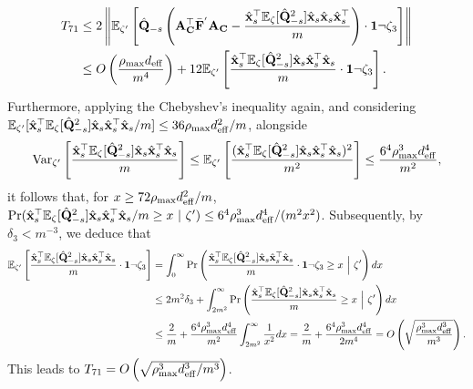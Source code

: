 \documentclass[11pt,a4paper]{article}
\begin{document}
\begin{align}
    T_{71}&\leq 2\left\|{\mathbb{E}}_{\zeta'}\left[\hat{\mathbf{Q}}_{-s}\left(\mathbf{A}_{\mathbf{C}}^\top\bar{\mathbf{F}}^{'}\mathbf{A}_{\mathbf{C}}-\frac{\hat{\mathbf{x}}_s^\top{\mathbb{E}}_{\zeta}[\hat{\mathbf{Q}}^2_{-s}]\hat{\mathbf{x}}_s\hat{\mathbf{x}}_s\hat{\mathbf{x}}_s^\top}{m}\right) \cdot \mathbf{1}\neg\zeta_3\right]\right\|\nonumber\\
    &\leq O\left(\frac{\rho_{\max}  d_{\mathrm{eff}}}{m^4}\right)+12 {\mathbb{E}}_{\zeta'}\left[\frac{\hat{\mathbf{x}}_s^\top{\mathbb{E}}_{\zeta}[\hat{\mathbf{Q}}^2_{-s}]\hat{\mathbf{x}}_s\hat{\mathbf{x}}_s^\top\hat{\mathbf{x}}_s}{m} \cdot \mathbf{1}\neg\zeta_3\right]. \nonumber
\end{align}
Furthermore, applying the Chebyshev's inequality again, and considering  ${\mathbb{E}}_{\zeta'}[\hat{\mathbf{x}}_s^\top{\mathbb{E}}_{\zeta}[\hat{\mathbf{Q}}^2_{-s}]\hat{\mathbf{x}}_s\hat{\mathbf{x}}_s^\top\hat{\mathbf{x}}_s/m]\leq 36\rho_{\max} d^2_{\mathrm{eff}}/m$, alongside 
\begin{align}
    \operatorname{Var}_{\zeta'}\left[\frac{\hat{\mathbf{x}}_s^\top{\mathbb{E}}_{\zeta}[\hat{\mathbf{Q}}^2_{-s}]\hat{\mathbf{x}}_s\hat{\mathbf{x}}_s^\top\hat{\mathbf{x}}_s}{m}
    \right]\leq {\mathbb{E}}_{\zeta'}\left[\frac{(\hat{\mathbf{x}}_s^\top{\mathbb{E}}_{\zeta}[\hat{\mathbf{Q}}^2_{-s}]\hat{\mathbf{x}}_s\hat{\mathbf{x}}_s^\top\hat{\mathbf{x}}_s)^2}{m^2}\right]\leq \frac{6^4\rho_{\max}^3d^4_{\mathrm{eff}}}{m^2},\nonumber
\end{align}
 it follows that, for  $x\geq 72\rho_{\max} d^2_{\mathrm{eff}}/m$, $ \Pr(\hat{\mathbf{x}}_s^\top {\mathbb{E}}_{\zeta}[\hat{\mathbf{Q}}^2_{-s}]\hat{\mathbf{x}}_s\hat{\mathbf{x}}_s^\top\hat{\mathbf{x}}_s/m\geq x~|~\zeta')\leq 
 6^4\rho_{\max}^3 d^4_{\mathrm{eff}}/(m^2x^2)$.
Subsequently, by $\delta_3<m^{-3}$,  we deduce that
 \begin{align}
    {\mathbb{E}}_{\zeta'}\left[\frac{\hat{\mathbf{x}}_s^\top{\mathbb{E}}_{\zeta}[\hat{\mathbf{Q}}^2_{-s}]\hat{\mathbf{x}}_s\hat{\mathbf{x}}_s^\top\hat{\mathbf{x}}_s}{m} \cdot \mathbf{1}\neg\zeta_3\right]&=\int^\infty_0 \Pr\left(\frac{\hat{\mathbf{x}}_s^\top {\mathbb{E}}_{\zeta}[\hat{\mathbf{Q}}^2_{-s}]\hat{\mathbf{x}}_s\hat{\mathbf{x}}_s^\top\hat{\mathbf{x}}_s}{m} \cdot \mathbf{1}\neg\zeta_3\geq x  ~\Big|~\zeta'\right)dx \nonumber\\
    &\leq 2m^{2}\delta_3+\int^\infty_{2m^{2}}\Pr\left(\frac{\hat{\mathbf{x}}_s^\top {\mathbb{E}}_{\zeta}[\hat{\mathbf{Q}}^2_{-s}]\hat{\mathbf{x}}_s\hat{\mathbf{x}}_s^\top\hat{\mathbf{x}}_s}{m}\geq x~\Big|~\zeta'\right)dx\nonumber\\
    &\leq \frac{2}{m}+ \frac{6^4\rho_{\max}^3 d^4_{\mathrm{eff}}}{m^2}\int^\infty_{2m^{2}}\frac{1}{x^2}dx= \frac{2}{m}+\frac{6^4\rho_{\max}^3 d^4_{\mathrm{eff}}}{2m^{4}} = O\left(\sqrt{\frac{\rho_{\max}^3 d^3_{\mathrm{eff}}}{m^3}} \right).\nonumber
 \end{align}
This leads to $T_{71}=O\left(\sqrt{\rho_{\max}^3 d^3_{\mathrm{eff}}/m^3}\right)$.
\end{document}
